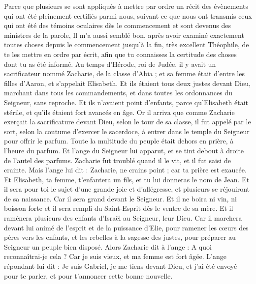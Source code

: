 \begin{multicols}{2}
\VerseOne{}Parce que plusieurs se sont appliqués à mettre par ordre un récit des évènements qui ont été pleinement certifiés parmi nous,
suivant ce que nous ont transmis ceux qui ont été des témoins oculaires dès le commencement et sont devenus des ministres de la parole,
Il m'a aussi semblé bon, après avoir examiné exactement toutes choses depuis le commencement jusqu'à la fin, très excellent Théophile, de te les mettre en ordre par écrit,
afin que tu connaisses la certitude des choses dont tu as été informé.
Au temps d'Hérode, roi de Judée, il y avait un sacrificateur nommé Zacharie, de la classe d'Abia ; et sa femme était d'entre les filles d'Aaron, et s'appelait Elisabeth.
Et ils étaient tous deux justes devant Dieu, marchant dans tous les commandements, et dans {toutes } les ordonnances du Seigneur, sans reproche.
Et ils n'avaient point d'enfants, parce qu'Elisabeth était stérile, et qu'ils étaient fort avancés en âge.
Or il arriva que comme Zacharie exerçait la sacrificature devant Dieu, selon le tour de sa classe, il fut appelé par le sort,
selon la coutume d'exercer le sacerdoce, à entrer dans le temple du Seigneur pour offrir le parfum.
Toute la multitude du peuple était dehors en prière, à l'heure du parfum.
Et l'ange du Seigneur lui apparut, et se tint debout à droite de l'autel des parfums.
Zacharie fut troublé quand il le vit, et il fut saisi de crainte.
Mais l'ange lui dit : Zacharie, ne crains point ; car ta prière est exaucée. Et Elisabeth, ta femme, t'enfantera un fils, et tu lui donneras le nom de Jean.
Et il sera pour toi le sujet d'une grande joie et d'allégresse, et plusieurs se réjouiront de sa naissance.
Car il sera grand devant le Seigneur. Et il ne boira ni vin, ni boisson forte et il sera rempli du Saint-Esprit dès le ventre de sa mère.
Et il ramènera plusieurs des enfants d'Israël au Seigneur, leur Dieu.
Car il marchera devant lui animé de l'esprit et de la puissance d'Elie, pour ramener les cœurs des pères vers les enfants, et les rebelles à la sagesse des justes, pour préparer au Seigneur un peuple bien disposé.
Alors Zacharie dit à l'ange : A quoi reconnaîtrai-je cela ? Car je suis vieux, et ma femme est fort âgée.
L'ange répondant lui dit : Je suis Gabriel, je me tiens devant Dieu, et j'ai été envoyé pour te parler, et pour t'annoncer cette bonne nouvelle.

\end{multicols}

